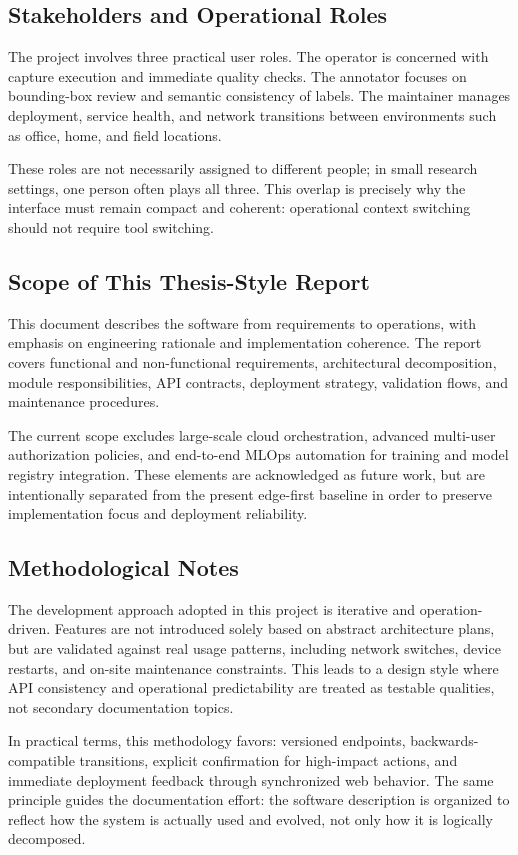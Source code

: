 \subsection{Stakeholders and Operational Roles}
The project involves three practical user roles. The operator is concerned with capture execution and immediate quality checks. The annotator focuses on bounding-box review and semantic consistency of labels. The maintainer manages deployment, service health, and network transitions between environments such as office, home, and field locations.

These roles are not necessarily assigned to different people; in small research settings, one person often plays all three. This overlap is precisely why the interface must remain compact and coherent: operational context switching should not require tool switching.

\subsection{Scope of This Thesis-Style Report}
This document describes the software from requirements to operations, with emphasis on engineering rationale and implementation coherence. The report covers functional and non-functional requirements, architectural decomposition, module responsibilities, API contracts, deployment strategy, validation flows, and maintenance procedures.

The current scope excludes large-scale cloud orchestration, advanced multi-user authorization policies, and end-to-end MLOps automation for training and model registry integration. These elements are acknowledged as future work, but are intentionally separated from the present edge-first baseline in order to preserve implementation focus and deployment reliability.

\subsection{Methodological Notes}
The development approach adopted in this project is iterative and operation-driven. Features are not introduced solely based on abstract architecture plans, but are validated against real usage patterns, including network switches, device restarts, and on-site maintenance constraints. This leads to a design style where API consistency and operational predictability are treated as testable qualities, not secondary documentation topics.

In practical terms, this methodology favors: versioned endpoints, backwards-compatible transitions, explicit confirmation for high-impact actions, and immediate deployment feedback through synchronized web behavior. The same principle guides the documentation effort: the software description is organized to reflect how the system is actually used and evolved, not only how it is logically decomposed.

